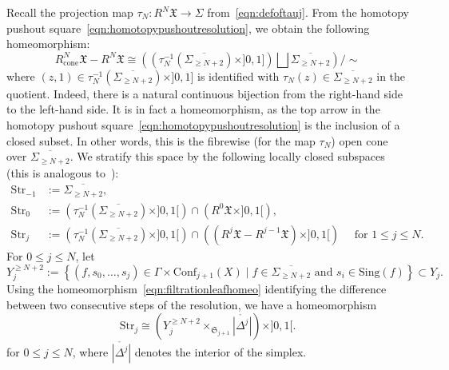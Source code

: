 \documentclass[a4paper]{amsart}
\newcommand{\fX}{\mathfrak X}
\newcommand{\fS}{\mathfrak S}
\theoremstyle{plain}
\theoremstyle{definition}
\newcommand{\Conf}{\mathrm{Conf}}
\newcommand{\Str}{\mathrm{Str}}
\begin{document}
\bigskip

Recall the projection map $\tau_N \colon R^N\fX \to \Sigma$ from~\eqref{eqn:defoftauj}. From the homotopy pushout square~\eqref{eqn:homotopypushoutresolution}, we obtain the following homeomorphism:
\[
    R^N_\text{cone}\fX - R^N\fX \cong \left( \left( \tau_N^{-1}\left(\overline{\Sigma_{\geq N+2}}\right) \times ]0,1] \right) \bigsqcup \overline{\Sigma_{\geq N+2}} \right) / \sim
\]
where $(z,1) \in \tau_N^{-1}\left(\overline{\Sigma_{\geq N+2}}\right) \times ]0,1]$ is identified with $\tau_N(z) \in \overline{\Sigma_{\geq N+2}}$ in the quotient. Indeed, there is a natural continuous bijection from the right-hand side to the left-hand side. It is in fact a homeomorphism, as the top arrow in the homotopy pushout square~\eqref{eqn:homotopypushoutresolution} is the inclusion of a closed subset. In other words, this is the fibrewise (for the map $\tau_N$) open cone over $\overline{\Sigma_{\geq N+2}}$. We stratify this space by the following locally closed subspaces (this is analogous to~\cite[Lemma 18]{tommasi_stable_2014}):
\begin{align*}
    \Str_{-1} &:= \overline{\Sigma_{\geq N+2}}, \\
    \Str_0 &:= \left( \tau_N^{-1}\left(\overline{\Sigma_{\geq N+2}}\right) \times ]0,1[ \right)  \cap  \left( R^0\fX \times ]0,1[\right), \\
    \Str_j &:= \left( \tau_N^{-1}\left(\overline{\Sigma_{\geq N+2}}\right) \times ]0,1[ \right)  \cap  \left( (R^j\fX - R^{j-1}\fX) \times ]0,1[\right) \quad \text{ for } 1 \leq j \leq N.
\end{align*}
For $0 \leq j \leq N$, let
\begin{equation}
    Y_j^{\geq N+2} := \left\{ (f,s_0,\ldots,s_j) \in \Gamma \times \Conf_{j+1}(X) \mid f \in \overline{\Sigma_{\geq N+2}} \text{ and } s_i \in \mathrm{Sing}(f) \right\} \subset Y_j.
\end{equation}
Using the homeomorphism~\eqref{eqn:filtrationleafhomeo} identifying the difference between two consecutive steps of the resolution, we have a homeomorphism
\begin{equation}\label{eqn:filtrationfjoncone}
    \Str_j \cong \left( Y_j^{\geq N+2} \times_{\fS_{j+1}} \mathring{|\Delta^j|} \right) \times ]0,1[.
\end{equation}
for $0 \leq j \leq N$, where $\mathring{|\Delta^j|}$ denotes the interior of the simplex.
\end{document}
